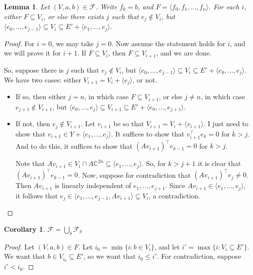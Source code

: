 \documentclass[12pt,psamsfonts]{article}
\newtheorem{lemma}[theorem]{Lemma}
\newtheorem{corollary}[theorem]{Corollary}
\begin{document}
\begin{lemma}
    Let \((V, a, b) \in \mathcal{F}\).
    Write \(f_0 = b\), and \(F = \langle f_0, f_1, ..., f_n \rangle\).
    For each \(i\), either \(F \subseteq V_i\), or else there exists \(j\) such that \(e_j \notin V_i\), but \(\langle e_0, ..., e_{j - 1} \rangle \subseteq V_i \subseteq E' + \langle e_1, ..., e_j \rangle\).
\end{lemma}
\begin{proof}
    For \(i = 0\), we may take \(j = 0\).
    Now assume the statement holds for \(i\), and we will prove it for \(i + 1\).
    If \(F \subseteq V_i\), then \(F \subseteq V_{i + 1}\), and we are done.
    \par So, suppose there is \(j\) such that \(e_j \notin V_i\), but \(\langle e_0, ..., e_{j - 1} \rangle \subseteq V_i \subseteq E' + \langle e_0, ..., e_j \rangle\).
    We have two cases: either \(V_{i + 1} = V_i + \langle e_j \rangle\), or not.
    \begin{itemize}
        \item If so, then either \(j = n\), in which case \(F \subseteq V_{i + 1}\), or else \(j \neq n\), in which case \(e_{j + 1} \notin V_{i + 1}\), but \(\langle e_0, ..., e_j \rangle \subseteq V_{i + 1} \subseteq E' + \langle e_0, ..., e_{j + 1} \rangle\).
        \item If not, then \(e_j \notin V_{i + 1}\).
        Let \(v_{i + 1}\) be so that \(V_{i + 1} = V_i + \langle v_{i + 1} \rangle\).
        I just need to show that \(v_{i + 1} \in Y + \langle e_1, ..., e_j \rangle\).
        It suffices to show that \(v_{i + 1}^\top e_k = 0\) for \(k > j\).
        And to do this, it suffices to show that \((Av_{i + 1})^\top e_{k - 1} = 0\) for \(k > j\).
        \par Note that \(Av_{i + 1} \in V_i \cap A \mathbb{C}^{2n} \subseteq \langle e_1, ..., e_j \rangle\).
        So, for \(k > j + 1\) it is clear that \((Av_{i + 1})^\top e_{k - 1} = 0\).
        Now, suppose for contradiction that \((Av_{i + 1})^\top e_j \neq 0\).
        Then \(Av_{i + 1}\) is linearly independent of \(e_1, ..., e_{j + 1}\).
        Since \(Av_{i + 1} \in \langle e_1, ..., e_j \rangle\), it follows that \(e_j \in \langle e_1, ..., e_{j - 1}, Av_{i + 1} \rangle \subseteq V_i\), a contradiction.
    \end{itemize}
\end{proof}

\begin{corollary}
    \(\mathcal{F} = \bigcup_\delta \mathcal{F}_\delta\)
\end{corollary}
\begin{proof}
    Let \((V, a, b) \in F\).
    Let \(i_0 = \min\{i : b \in V_i\}\), and let \(i' = \max\{i : V_i \subseteq E'\}\).
    We want that \(b \in V_{i_0} \subseteq E'\), so we want that \(i_0 \leq i'\).
    For contradiction, suppose \(i' < i_0\).

\end{proof}
\end{document}
